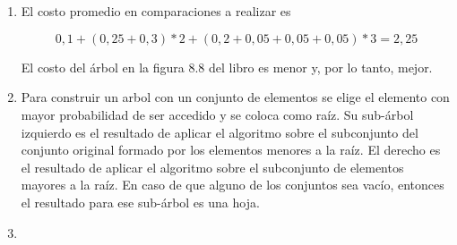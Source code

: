 \documentclass{article}
\begin{document}
\section{}

\renewcommand{\labelenumi}{(\alph{enumi})}


\begin{enumerate}
 \item El costo promedio en comparaciones a realizar es

$$
0,1 + (0,25+0,3)*2 + (0,2+0,05+0,05+0,05)*3 = 2,25
$$

El costo del árbol en la figura 8.8 del libro es menor y, por lo tanto, mejor.

 \item

Para construir un arbol con un conjunto de elementos se elige el elemento con mayor probabilidad
de ser accedido y se coloca como raíz. Su sub-árbol izquierdo es el resultado de aplicar el algoritmo
sobre el subconjunto del conjunto original formado por los elementos menores a la raíz. El derecho es el
resultado
de aplicar el algoritmo sobre el subconjunto de elementos mayores a la raíz. En caso de que alguno
de los conjuntos sea vacío, entonces el resultado para ese sub-árbol es una hoja.

 \item
\end{enumerate}

\section{}
\end{document}
